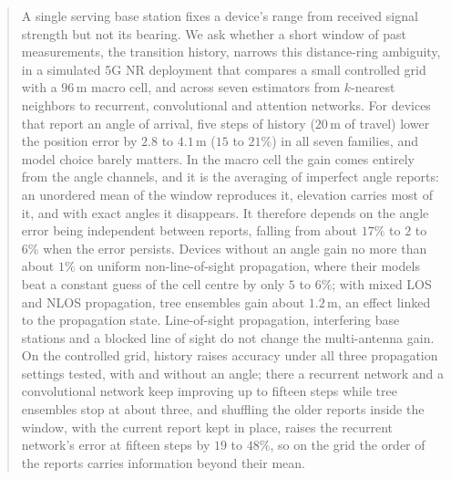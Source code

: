 \begin{abstract}
A single serving base station fixes a device's range from received signal strength but not its bearing. We ask whether a short window of past measurements, the transition history, narrows this distance-ring ambiguity, in a simulated 5G NR deployment that compares a small controlled grid with a $96\,\text{m}$ macro cell, and across seven estimators from $k$-nearest neighbors to recurrent, convolutional and attention networks.
For devices that report an angle of arrival, five steps of history ($20\,\text{m}$ of travel) lower the position error by $2.8$ to $4.1\,\text{m}$ ($15$ to $21\%$) in all seven families, and model choice barely matters.
In the macro cell the gain comes entirely from the angle channels, and it is the averaging of imperfect angle reports: an unordered mean of the window reproduces it, elevation carries most of it, and with exact angles it disappears. It therefore depends on the angle error being independent between reports, falling from about $17\%$ to $2$ to $6\%$ when the error persists.
Devices without an angle gain no more than about $1\%$ on uniform non-line-of-sight propagation, where their models beat a constant guess of the cell centre by only $5$ to $6\%$; with mixed LOS and NLOS propagation, tree ensembles gain about $1.2\,\text{m}$, an effect linked to the propagation state.
Line-of-sight propagation, interfering base stations and a blocked line of sight do not change the multi-antenna gain. On the controlled grid, history raises accuracy under all three propagation settings tested, with and without an angle; there a recurrent network and a convolutional network keep improving up to fifteen steps while tree ensembles stop at about three, and shuffling the older reports inside the window, with the current report kept in place, raises the recurrent network's error at fifteen steps by $19$ to $48\%$, so on the grid the order of the reports carries information beyond their mean.
\end{abstract}
